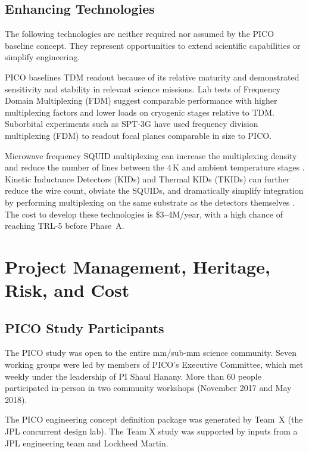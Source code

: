 \subsection{Enhancing Technologies}
\label{sec:enhancing_technologies} %

The following technologies are neither required nor assumed by the
PICO baseline concept. They represent opportunities to extend
scientific capabilities or simplify engineering.

PICO baselines TDM readout because of its relative maturity and
demonstrated sensitivity and stability in relevant science
missions. Lab tests of Frequency Domain Multiplexing (FDM) suggest
comparable performance with higher multiplexing factors and lower
loads on cryogenic stages relative to TDM. Suborbital experiments such
as SPT-3G have used frequency division multiplexing (FDM) to readout
focal planes comparable in size to PICO.

Microwave frequency SQUID multiplexing can increase the multiplexing
density and reduce the number of lines between the 4\,K and ambient
temperature stages \citep{Dober2017,Irwin2004}. Kinetic Inductance
Detectors (KIDs) and Thermal KIDs (TKIDs) can further reduce the wire
count, obviate the SQUIDs, and dramatically simplify integration by
performing multiplexing on the same substrate as the detectors
themselves \citep{McCarrick2018,Steinbach2018,Johnson2018}. The cost to develop
these technologies is \$3--4M/year, with a high chance of reaching
TRL-5 before Phase~A.

\section{Project Management, Heritage, Risk, and Cost}
\label{sec:project_management} %

\subsection{PICO Study Participants}
\label{sec:study_participants} %

The PICO study was open to the entire mm/sub-mm science community.
Seven working groups were led by
members of PICO's Executive Committee, which met weekly under the
leadership of PI Shaul Hanany. More than 60 people participated
in-person in two community workshops (November 2017 and May 2018).

The PICO engineering concept definition package was generated by
Team~X (the JPL concurrent design lab). The Team X study was supported
by inputs from a JPL engineering team and Lockheed Martin.


